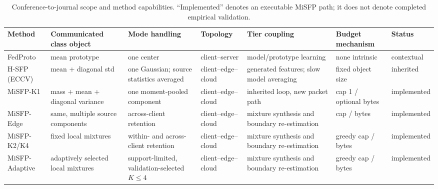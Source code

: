 \begin{table}[t]
\caption{Conference-to-journal scope and method capabilities. ``Implemented'' denotes an executable MiSFP path; it does not denote completed empirical validation.}\label{tab:extension}
\centering\small
\begin{tabularx}{\textwidth}{lXXXXXX}
\toprule
Method & Communicated class object & Mode handling & Topology & Tier coupling & Budget mechanism & Status\\
\midrule
FedProto & mean prototype & one center & client--server & model/prototype learning & none intrinsic & contextual\\
H-SFP (ECCV) & mean + diagonal std & one Gaussian; source statistics averaged & client--edge--cloud & generated features; slow model averaging & fixed object size & inherited\\
MiSFP-K1 & mass + mean + diagonal variance & one moment-pooled component & client--edge--cloud & inherited loop, new packet path & cap 1 / optional bytes & implemented\\
MiSFP-Edge & same, multiple source components & across-client retention & client--edge--cloud & mixture synthesis and boundary re-estimation & cap / bytes & implemented\\
MiSFP-K2/K4 & fixed local mixtures & within- and across-client retention & client--edge--cloud & mixture synthesis and boundary re-estimation & greedy cap / bytes & implemented\\
MiSFP-Adaptive & adaptively selected local mixtures & support-limited, validation-selected $K\le4$ & client--edge--cloud & mixture synthesis and boundary re-estimation & greedy cap / bytes & implemented\\
\bottomrule
\end{tabularx}
\end{table}
